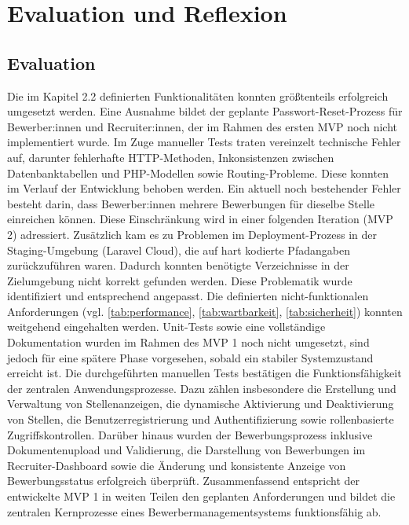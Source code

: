 \section{Evaluation und Reflexion}
\subsection{Evaluation}
Die im Kapitel 2.2 definierten Funktionalitäten konnten größtenteils erfolgreich umgesetzt werden. 
Eine Ausnahme bildet der geplante Passwort-Reset-Prozess für Bewerber:innen und Recruiter:innen, der im Rahmen des ersten MVP noch nicht implementiert wurde.
\newline
Im Zuge manueller Tests traten vereinzelt technische Fehler auf, darunter fehlerhafte HTTP-Methoden, Inkonsistenzen zwischen Datenbanktabellen und PHP-Modellen sowie Routing-Probleme. 
Diese konnten im Verlauf der Entwicklung behoben werden. 
Ein aktuell noch bestehender Fehler besteht darin, dass Bewerber:innen mehrere Bewerbungen für dieselbe Stelle einreichen können. 
Diese Einschränkung wird in einer folgenden Iteration (MVP 2) adressiert.
\newline
Zusätzlich kam es zu Problemen im Deployment-Prozess in der Staging-Umgebung (Laravel Cloud), die auf hart kodierte Pfadangaben zurückzuführen waren. 
Dadurch konnten benötigte Verzeichnisse in der Zielumgebung nicht korrekt gefunden werden. 
Diese Problematik wurde identifiziert und entsprechend angepasst.
\newline
Die definierten nicht-funktionalen Anforderungen (vgl. \ref{tab:performance}, \ref{tab:wartbarkeit}, \ref{tab:sicherheit})
konnten weitgehend eingehalten werden. Unit-Tests sowie eine vollständige Dokumentation wurden im Rahmen des MVP 1 noch nicht umgesetzt, sind jedoch für eine spätere Phase vorgesehen, sobald ein stabiler Systemzustand erreicht ist.
\newline
Die durchgeführten manuellen Tests bestätigen die Funktionsfähigkeit der zentralen Anwendungsprozesse. 
Dazu zählen insbesondere die Erstellung und Verwaltung von Stellenanzeigen, die dynamische Aktivierung und Deaktivierung von Stellen, die Benutzerregistrierung und Authentifizierung sowie rollenbasierte Zugriffskontrollen. 
Darüber hinaus wurden der Bewerbungsprozess inklusive Dokumentenupload und Validierung, die Darstellung von Bewerbungen im Recruiter-Dashboard sowie die Änderung und konsistente Anzeige von Bewerbungsstatus erfolgreich überprüft.
\newline
Zusammenfassend entspricht der entwickelte MVP 1 in weiten Teilen den geplanten Anforderungen und bildet die zentralen Kernprozesse eines Bewerbermanagementsystems funktionsfähig ab.
